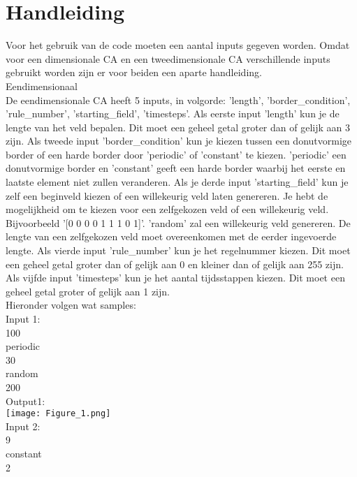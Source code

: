 \documentclass[12pt,a4paper]{article}
\begin{document}
\section*{Handleiding}
Voor het gebruik van de code moeten een aantal inputs gegeven worden. Omdat voor een dimensionale CA en een tweedimensionale CA verschillende inputs gebruikt worden zijn er voor beiden een aparte handleiding. \\
\newline\large{Eendimensionaal} \\
\newline\normalsize De eendimensionale CA heeft 5 inputs, in volgorde: 'length', 'border\_condition', 'rule\_number', 'starting\_field', 'timesteps'. Als eerste input 'length' kun je de lengte van het veld bepalen. Dit moet een geheel getal groter dan of gelijk aan 3 zijn. Als tweede input 'border\_condition' kun je kiezen tussen een donutvormige border of een harde border door 'periodic' of 'constant' te kiezen. 'periodic' een donutvormige border en 'constant' geeft een harde border waarbij het eerste en laatste element niet zullen veranderen. Als je derde input 'starting\_field' kun je zelf een beginveld kiezen of een willekeurig veld laten genereren.
Je hebt de mogelijkheid om te kiezen voor een zelfgekozen veld of een willekeurig veld. Bijvoorbeeld '[0 0 0 0 1 1 1 0 1]'. 'random' zal een willekeurig veld genereren. De lengte van een zelfgekozen veld moet overeenkomen met de eerder ingevoerde lengte. Als vierde input 'rule\_number' kun je het regelnummer kiezen. Dit moet een geheel getal groter dan of gelijk aan 0 en kleiner dan of gelijk aan 255 zijn. Als vijfde input 'timesteps' kun je het aantal tijdsstappen kiezen. Dit moet een geheel getal groter of gelijk aan 1 zijn. \\
Hieronder volgen wat samples: \\
Input 1: \\
100 \\
periodic \\
30 \\
random \\
200 \\
\newline Output1: \\
\newline \texttt{[image: Figure\_1.png]} \\
Input 2: \\
9 \\
constant \\
2 \\
\end{document}
